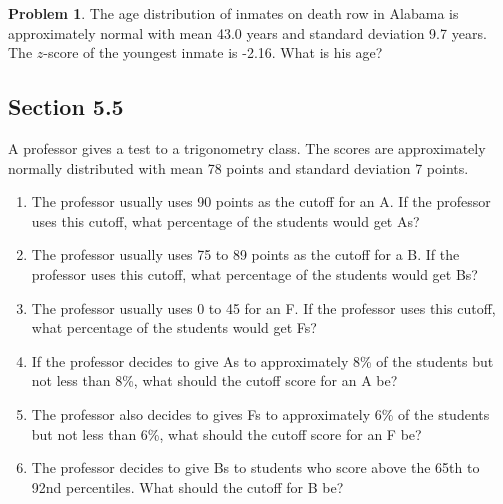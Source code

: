 \documentclass[11pt]{scrartcl}
\theoremstyle{definition}
\newtheorem{problem}[theorem]{Problem}
\begin{document}
\begin{problem}
	The age distribution of inmates on death row in Alabama is approximately normal with mean 43.0 years and standard deviation 9.7 years. The $z$-score of the youngest inmate is -2.16. What is his age?
\end{problem}

\vspace{1cm}

\subsection*{Section 5.5}
A professor gives a test to a trigonometry class. The scores are approximately normally distributed with mean 78 points and standard deviation 7 points.
\begin{enumerate}
	\item The professor usually uses 90 points as the cutoff for an A. If the professor uses this cutoff, what percentage of the students would get As?
	\item The professor usually uses 75 to 89 points as the cutoff for a B. If the professor uses this cutoff, what percentage of the students would get Bs?
	\item The professor usually uses 0 to 45 for an F. If the professor uses this cutoff, what percentage of the students would get Fs?
	\item If the professor decides to give As to approximately 8\% of the students but not less than 8\%, what should the cutoff score for an A be?
	\item The professor also decides to gives Fs to approximately 6\% of the students but not less than 6\%, what should the cutoff score for an F be?
	\item The professor decides to give Bs to students who score above the 65th to 92nd percentiles. What should the cutoff for B be?
\end{enumerate}

\newpage
\end{document}
